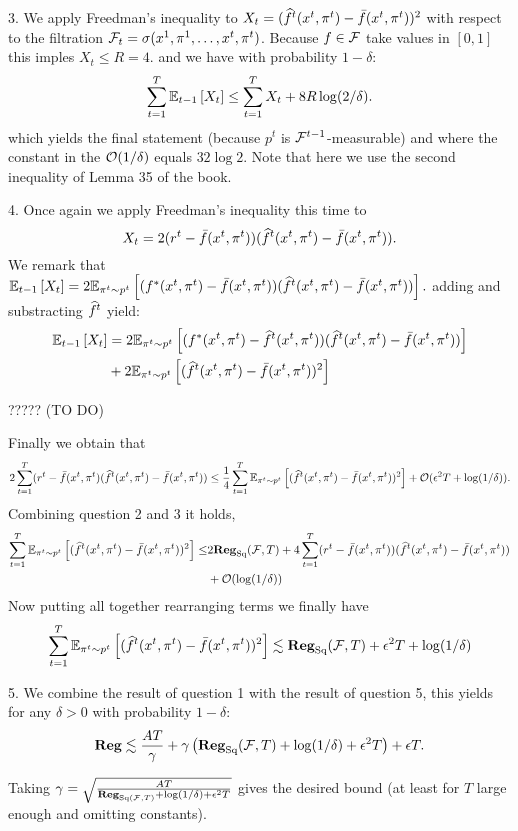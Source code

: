 \begin{solution}[]
3. We apply Freedman’s inequality to $X_t = (\wh f^t(x^t,\pi^t)-\bar f(x^t,\pi^t))^2$ with respect to the filtration $\F_t = \sigma(x^1,\pi^1,\ldots,x^t,\pi^t)$.
Because $f \in \F$ take values in $[0,1]$ this imples $X_t \leq R= 4.$ and we have with probability $1-\delta$: 
\[\sum_{t=1}^T \EEs{X_t}{t-1}  \leq \sum_{t=1}^T X_t + 8R\log(2/ \delta). \]
which yields the final statement (because $p^t$ is $\F^{t-1}$-measurable) and where the constant in the $\OO (1/\delta)$ equals $32 \log 2$.
Note that here we use the second inequality of Lemma 35 of the book.

4. Once again we apply Freedman’s inequality this time to 
\[X_t = 2(r^t-\bar f(x^t,\pi^t))(\wh f^t(x^t,\pi^t)-\bar f(x^t,\pi^t)).\]
We remark that $\EEs{X_t}{t-1} = 2\EEs{(f^*(x^t,\pi^t)-\bar f(x^t,\pi^t))(\wh f^t(x^t,\pi^t)-\bar f(x^t,\pi^t))}{\pi^t \sim p^t}.$
adding and substracting $\wh f^t$ yield:
\begin{align*}\EEs{X_t}{t-1} &=2\EEs{(f^*(x^t,\pi^t)-\wh f^t(x^t,\pi^t))(\wh f^t(x^t,\pi^t)-\bar f(x^t,\pi^t))}{\pi^t \sim p^t}\\ 
&+2\EEs{(\wh f^t(x^t,\pi^t)-\bar f(x^t,\pi^t))^2}{\pi^t \sim p^t}
\end{align*}


????? (TO DO)

Finally we obtain that  \[ 2\sum_{t=1}^T (r^t-\bar f(x^t,\pi^t)(\wh f^t(x^t,\pi^t)-\bar f(x^t,\pi^t))\leq \frac{1}{4}\sum_{t=1}^T \EEs{(\wh f^t(x^t,\pi^t)-\bar f(x^t,\pi^t))^2}{\pi^t \sim p^t}  + \OO(\epsilon^2 T + \log(1/\delta)).\]
Combining question 2 and 3 it holds,
\begin{align*}
\sum_{t=1}^T \EEs{(\wh f^t (x^t,\pi^t)-\bar f(x^t,\pi^t))^2}{\pi^t \sim p^t}  \leq &2 \Reg_{\text{Sq}}(\F,T)+4\sum_{t=1}^T(r^t-\bar f(x^t,\pi^t))(\wh f^t(x^t,\pi^t)-\bar f(x^t,\pi^t))\\
&+\OO(\log(1/\delta))
\end{align*}
Now putting all together rearranging terms we finally have 
\[\sum_{t=1}^T \EEs{(\wh f^t (x^t,\pi^t)-\bar f(x^t,\pi^t))^2}{\pi^t \sim p^t} \lesssim \Reg_{\text{Sq}}(\F,T)+\epsilon^2T+\log(1/\delta)\]




5. We combine the result of question 1 with the result of question 5, this yields for any $\delta > 0$ with probability $1-\delta$:
\[ \Reg \lesssim \frac{AT}{\gamma} + \gamma \left( \Reg_{\text{Sq}}(\F,T) + \log(1/\delta)+ \epsilon^2 T \right) + \epsilon T.\]

Taking $\gamma = \sqrt{\frac{AT}{\Reg_{\text{Sq}(\F,T)}+\log(1/\delta) + \epsilon^2 T}}$  gives the desired bound (at least for $T$ large enough and omitting constants).

\end{solution}
